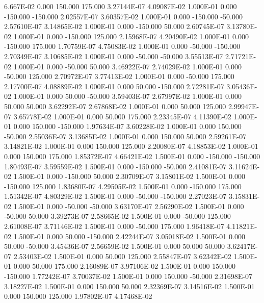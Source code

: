   6.667E-02     0.000   150.000   175.000 3.27144E-07 4.09087E-02
  1.000E-01     0.000  -150.000  -150.000 2.02557E-07 3.60357E-02
  1.000E-01     0.000  -150.000   -50.000 2.57610E-07 3.14865E-02
  1.000E-01     0.000  -150.000    50.000 2.60745E-07 3.13780E-02
  1.000E-01     0.000  -150.000   125.000 2.15968E-07 4.20490E-02
  1.000E-01     0.000  -150.000   175.000 1.70759E-07 4.75083E-02
  1.000E-01     0.000   -50.000  -150.000 2.70349E-07 3.10685E-02
  1.000E-01     0.000   -50.000   -50.000 3.55513E-07 2.71721E-02
  1.000E-01     0.000   -50.000    50.000 3.46922E-07 2.74029E-02
  1.000E-01     0.000   -50.000   125.000 2.70972E-07 3.77413E-02
  1.000E-01     0.000   -50.000   175.000 2.17700E-07 4.08889E-02
  1.000E-01     0.000    50.000  -150.000 2.72281E-07 3.05436E-02
  1.000E-01     0.000    50.000   -50.000 3.59403E-07 2.67997E-02
  1.000E-01     0.000    50.000    50.000 3.62292E-07 2.67868E-02
  1.000E-01     0.000    50.000   125.000 2.99947E-07 3.65778E-02
  1.000E-01     0.000    50.000   175.000 2.23345E-07 4.11390E-02
  1.000E-01     0.000   150.000  -150.000 1.97634E-07 3.60228E-02
  1.000E-01     0.000   150.000   -50.000 2.55036E-07 3.13685E-02
  1.000E-01     0.000   150.000    50.000 2.59261E-07 3.14821E-02
  1.000E-01     0.000   150.000   125.000 2.20080E-07 4.18853E-02
  1.000E-01     0.000   150.000   175.000 1.85372E-07 4.66421E-02
  1.500E-01     0.000  -150.000  -150.000 1.80493E-07 3.59559E-02
  1.500E-01     0.000  -150.000   -50.000 2.41081E-07 3.11624E-02
  1.500E-01     0.000  -150.000    50.000 2.30709E-07 3.15801E-02
  1.500E-01     0.000  -150.000   125.000 1.83680E-07 4.29505E-02
  1.500E-01     0.000  -150.000   175.000 1.51342E-07 4.80329E-02
  1.500E-01     0.000   -50.000  -150.000 2.27023E-07 3.15831E-02
  1.500E-01     0.000   -50.000   -50.000 3.63170E-07 2.56290E-02
  1.500E-01     0.000   -50.000    50.000 3.39273E-07 2.58665E-02
  1.500E-01     0.000   -50.000   125.000 2.61008E-07 3.71146E-02
  1.500E-01     0.000   -50.000   175.000 1.96418E-07 4.11821E-02
  1.500E-01     0.000    50.000  -150.000 2.42244E-07 3.05018E-02
  1.500E-01     0.000    50.000   -50.000 3.45436E-07 2.56659E-02
  1.500E-01     0.000    50.000    50.000 3.62417E-07 2.53403E-02
  1.500E-01     0.000    50.000   125.000 2.55847E-07 3.62342E-02
  1.500E-01     0.000    50.000   175.000 2.16089E-07 3.97106E-02
  1.500E-01     0.000   150.000  -150.000 1.77242E-07 3.70037E-02
  1.500E-01     0.000   150.000   -50.000 2.31698E-07 3.18227E-02
  1.500E-01     0.000   150.000    50.000 2.32369E-07 3.14516E-02
  1.500E-01     0.000   150.000   125.000 1.97802E-07 4.17468E-02
